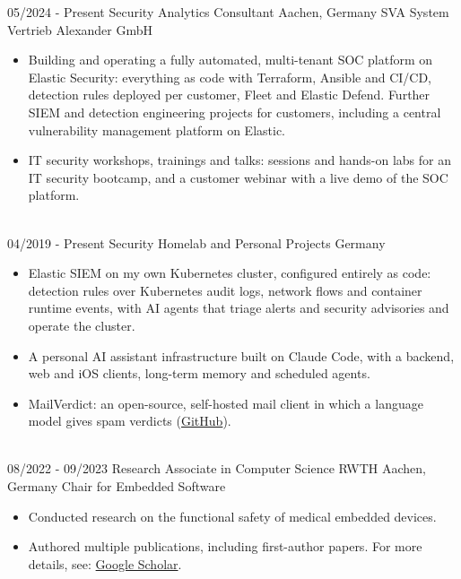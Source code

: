 \begin{twenty}
    \twentyitem
        {05/2024 -}
        {Present}
        {Security Analytics Consultant}
        {Aachen, Germany}
        {SVA System Vertrieb Alexander GmbH}
        {\begin{itemize}
            \item Building and operating a fully automated, multi-tenant SOC platform on Elastic Security: everything as code with Terraform, Ansible and CI/CD, detection rules deployed per customer, Fleet and Elastic Defend. Further SIEM and detection engineering projects for customers, including a central vulnerability management platform on Elastic.
            \item IT security workshops, trainings and talks: sessions and hands-on labs for an IT security bootcamp, and a customer webinar with a live demo of the SOC platform.
        \end{itemize}}
        \\
    \twentyitem
        {04/2019 -}
        {Present}
        {Security Homelab and Personal Projects}
        {Germany}
        {}
        {\begin{itemize}
            \item Elastic SIEM on my own Kubernetes cluster, configured entirely as code: detection rules over Kubernetes audit logs, network flows and container runtime events, with AI agents that triage alerts and security advisories and operate the cluster.
            \item A personal AI assistant infrastructure built on Claude Code, with a backend, web and iOS clients, long-term memory and scheduled agents.
            \item MailVerdict: an open-source, self-hosted mail client in which a language model gives spam verdicts (\href{https://github.com/frederikberg/mail-verdict}{GitHub}).
        \end{itemize}}
        \\
    \twentyitem
        {08/2022 -}
        {09/2023}
        {Research Associate in Computer Science}
        {RWTH Aachen, Germany}
        {Chair for Embedded Software}
        {\begin{itemize}
            \item Conducted research on the functional safety of medical embedded devices.
            \item Authored multiple publications, including first-author papers. For more details, see: \href{https://scholar.google.com/citations?user=cmAmnmcAAAAJ}{Google Scholar}.

\end{itemize}}
\end{twenty}
